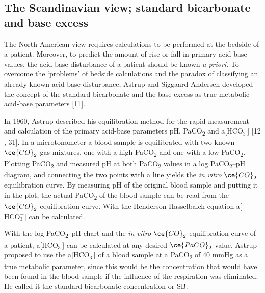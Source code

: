 \documentclass[
  12pt,
  a4paperpaper,
]{report}
\begin{document}
\hypertarget{the-scandinavian-view-standard-bicarbonate-and-base-excess}{%
\subsection{The Scandinavian view; standard bicarbonate and base
excess}\label{the-scandinavian-view-standard-bicarbonate-and-base-excess}}

The North American view requires calculations to be performed at the
bedside of a patient. Moreover, to predict the amount of rise or fall in
primary acid-base values, the acid-base disturbance of a patient should
be known \emph{a priori}. To overcome the `problems' of bedside
calculations and the paradox of classifying an already known acid-base
disturbance, Astrup and Siggaard-Andersen developed the concept of the
standard bicarbonate and the base excess as true metabolic acid-base
parameters {[}11{]}.

In 1960, Astrup described his equilibration method for the rapid
measurement and calculation of the primary acid-base parameters pH,
Pa\textsc{CO}\textsubscript{2} and a{[}\(\text{HCO}_{3}^{-}\){]} {[}12 ,
31{]}. In a microtonometer a blood sample is equilibrated with two known
\(\ce{CO}_{2}\) gas mixtures, one with a high
Pa\textsc{CO}\textsubscript{2} and one with a low
Pa\textsc{CO}\textsubscript{2}. Plotting Pa\textsc{CO}\textsubscript{2}
and measured pH at both Pa\textsc{CO}\textsubscript{2} values in a log
Pa\textsc{CO}\textsubscript{2}--pH diagram, and connecting the two
points with a line yields the \emph{in vitro} \(\ce{CO}_{2}\)
equilibration curve. By measuring pH of the original blood sample and
putting it in the plot, the actual Pa\textsc{CO}\textsubscript{2} of the
blood sample can be read from the \(\ce{CO}_{2}\) equilibration curve.
With the Henderson-Hasselbalch equation a{[}\(\text{HCO}_{3}^{-}\){]}
can be calculated.

With the log Pa\textsc{CO}\textsubscript{2}--pH chart and the \emph{in
vitro} \(\ce{CO}_{2}\) equilibration curve of a patient,
a{[}\(\text{HCO}_{3}^{-}\){]} can be calculated at any desired
\(\ce{PaCO}_{2}\) value. Astrup proposed to use the
a{[}\(\text{HCO}_{3}^{-}\){]} of a blood sample at a
Pa\textsc{CO}\textsubscript{2} of 40 mmHg as a true metabolic parameter,
since this would be the concentration that would have been found in the
blood sample if the influence of the respiration was eliminated. He
called it the standard bicarbonate concentration or SB.
\end{document}
